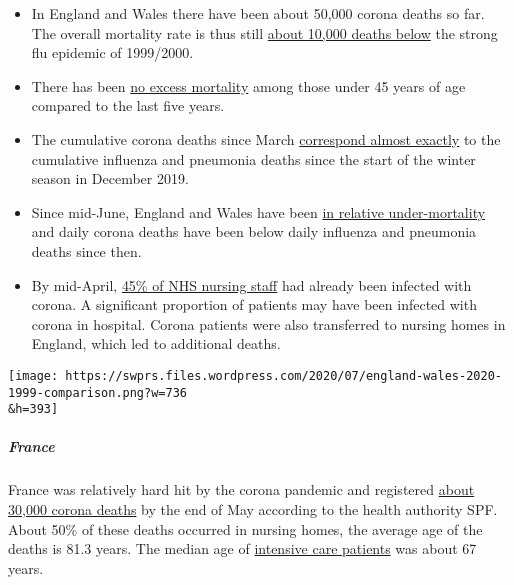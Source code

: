 \begin{itemize}
\tightlist
\item
  In England and Wales there have been about 50,000 corona deaths so
  far. The overall mortality rate is thus still
  \href{http://inproportion2.talkigy.com/}{about 10,000 deaths below}
  the strong flu epidemic of 1999/2000.
\item
  There has been \href{http://inproportion2.talkigy.com/}{no excess
  mortality} among those under 45 years of age compared to the last five
  years.
\item
  The cumulative corona deaths since March
  \href{http://inproportion2.talkigy.com/}{correspond almost exactly} to
  the cumulative influenza and pneumonia deaths since the start of the
  winter season in December 2019.
\item
  Since mid-June, England and Wales have been
  \href{https://www.ons.gov.uk/peoplepopulationandcommunity/birthsdeathsandmarriages/deaths/bulletins/deathsregisteredweeklyinenglandandwalesprovisional/weekending17july2020}{in
  relative under-mortality} and daily corona deaths have been below
  daily influenza and pneumonia deaths since then.
\item
  By mid-April,
  \href{https://www.thesun.co.uk/news/12182503/nearly-half-nhs-workers-infected-coronavirus-peak-epidemic/}{45\%
  of NHS nursing staff} had already been infected with corona. A
  significant proportion of patients may have been infected with corona
  in hospital. Corona patients were also transferred to nursing homes in
  England, which led to additional deaths.
\end{itemize}

\texttt{[image: https://swprs.files.wordpress.com/2020/07/england-wales-2020-1999-comparison.png?w=736\\\&h=393]}

\hypertarget{france}{%
\subparagraph{\texorpdfstring{\textbf{France}}{France}}\label{france}}

France was relatively hard hit by the corona pandemic and registered
\href{https://www.santepubliquefrance.fr/maladies-et-traumatismes/maladies-et-infections-respiratoires/infection-a-coronavirus/documents/rapport-synthese/surveillance-de-la-mortalite-au-cours-de-l-epidemie-de-covid-19-du-2-mars-au-31-mai-2020-en-france}{about
30,000 corona deaths} by the end of May according to the health
authority SPF. About 50\% of these deaths occurred in nursing homes, the
average age of the deaths is 81.3 years. The median age of
\href{https://www.santepubliquefrance.fr/content/download/260891/2645733}{intensive
care patients} was about 67 years.

